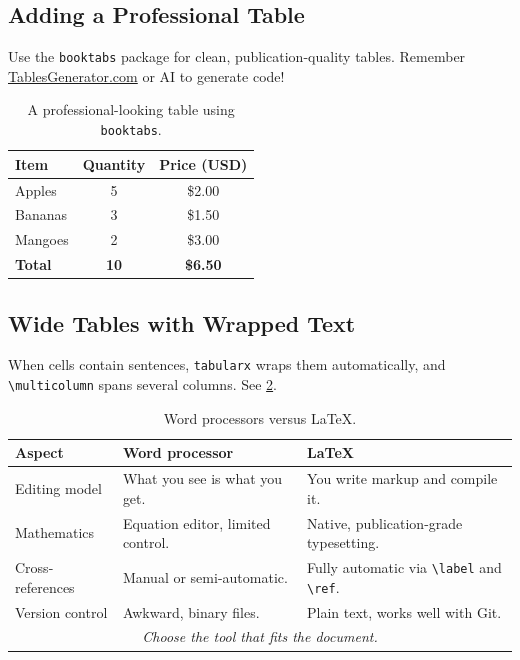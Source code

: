\documentclass[12pt, a4paper]{article}
\theoremstyle{plain}
\theoremstyle{definition}
\begin{document}
\subsection{Adding a Professional Table}
Use the \texttt{booktabs} package for clean, publication-quality tables.
Remember \href{https://www.tablesgenerator.com/}{TablesGenerator.com} or AI to generate code!

\begin{table}[htbp]
    \centering
    \caption{A professional-looking table using \texttt{booktabs}.}
    \label{tab:my_table}
    \begin{tabular}{lcc}
        \toprule
        \textbf{Item} & \textbf{Quantity} & \textbf{Price (USD)} \\
        \midrule
        Apples    & 5 & \$2.00 \\
        Bananas   & 3 & \$1.50 \\
        Mangoes   & 2 & \$3.00 \\
        \midrule
        \textbf{Total} & \textbf{10} & \textbf{\$6.50} \\
        \bottomrule
    \end{tabular}
\end{table}

\subsection{Wide Tables with Wrapped Text}
When cells contain sentences, \texttt{tabularx} wraps them automatically, and \verb|\multicolumn| spans several columns. See \cref{tab:compare}.

\begin{table}[htbp]
    \centering
    \caption{Word processors versus \LaTeX.}
    \label{tab:compare}
    \begin{tabularx}{\textwidth}{lXX}
        \toprule
        \textbf{Aspect} & \textbf{Word processor} & \textbf{\LaTeX} \\
        \midrule
        Editing model  & What you see is what you get. & You write markup and compile it. \\
        Mathematics    & Equation editor, limited control. & Native, publication-grade typesetting. \\
        Cross-references & Manual or semi-automatic. & Fully automatic via \texttt{\textbackslash label} and \texttt{\textbackslash ref}. \\
        Version control & Awkward, binary files. & Plain text, works well with Git. \\
        \midrule
        \multicolumn{3}{c}{\textit{Choose the tool that fits the document.}} \\
        \bottomrule
    \end{tabularx}
\end{table}
\end{document}
